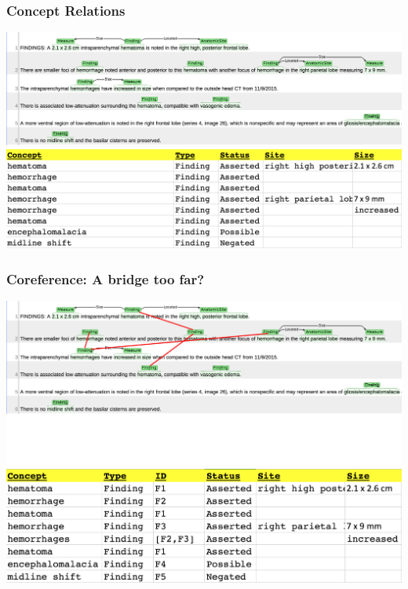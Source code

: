 \documentclass[10pt]{beamer}
\begin{document}
\begin{frame}
\frametitle{Concept Relations}

\begin{center}
	\includegraphics[scale=0.3]{figures/ct-scan-rels.png}
	\\ \vspace{1em}
	\includegraphics[scale=0.25]{figures/ct-scan-rels-structured.png}
\end{center}

\end{frame}

\begin{frame}
\frametitle{Coreference: A bridge too far?}

\begin{center}
	\includegraphics[scale=0.3]{figures/ct-scan-refs.png}
	\\
	\includegraphics[scale=0.25]{figures/ct-scan-refs-structured.png}
\end{center}

\end{frame}
\end{document}
